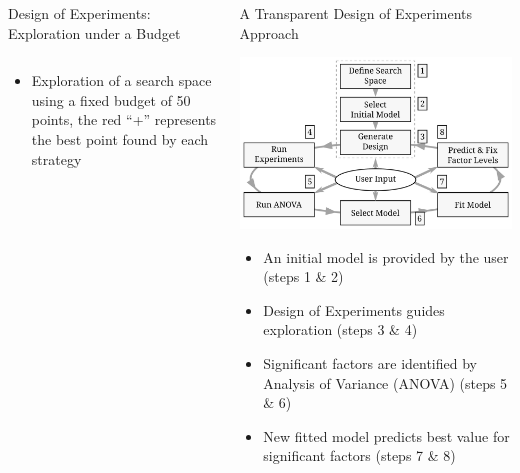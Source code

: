 \documentclass[11pt, compress, aspectratio=169, xcolor={table,usenames,dvipsnames}]{beamer}
\begin{document}
\begin{frame}
\begin{columns}
\begin{column}{0.86\columnwidth}
\begin{columns}
\begin{column}[t]{0.5\columnwidth}
\begin{block}{Design of Experiments: Exploration under a Budget}
\begin{columns}
\begin{column}{0.59\columnwidth}
\begin{itemize}
\item Exploration of a search space using a \alert{fixed budget}
of \alert{50 points}, the \alert{red “+”} represents the best point found by
each strategy
\end{itemize}
\end{column}
\end{columns}
\end{block}
\end{column}
\begin{column}[t]{0.5\columnwidth}
\begin{block}{A Transparent Design of Experiments Approach}
\begin{center}
\includegraphics[width=0.8\columnwidth]{../../../img/doe_anova_strategy.pdf}
\end{center}

\vspace{1em}

\begin{itemize}
\item An \alert{initial model} is provided by the \alert{user} (steps \alert{1} \& \alert{2})
\item \alert{Design of Experiments} guides exploration (steps \alert{3} \& \alert{4})
\item \alert{Significant factors} are identified by \alert{Analysis of Variance (ANOVA)} (steps \alert{5} \& \alert{6})
\item New fitted model predicts best value for significant factors (steps \alert{7} \& \alert{8})
\end{itemize}


\end{block}
\end{column}
\end{columns}
\end{column}
\end{columns}
\end{frame}
\end{document}
